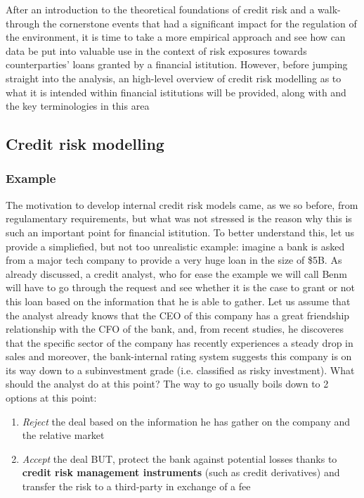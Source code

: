 \documentclass[a4paper,12pt]{article}
\begin{document}
    After an introduction to the theoretical foundations of credit risk and a walk-through the cornerstone events that had a significant impact for the regulation of the environment,
    it is time to take a more empirical approach and see how can data be put into valuable use in the context of risk exposures towards counterparties' loans granted by a financial istitution.
    However, before jumping straight into the analysis, an high-level overview of credit risk modelling as to what it is intended within financial istitutions will be provided, along with and the key terminologies in this area

    \subsection[]{Credit risk modelling}

    \subsubsection{Example}
    The motivation to develop internal credit risk models came, as we so before, from regulamentary requirements, but what was not stressed is the reason why this is such an important point
    for financial istitution. To better understand this, let us provide a simpliefied, but not too unrealistic example: imagine a bank is asked from a major tech company to provide a very huge
    loan in the size of \$5B. As already discussed, a credit analyst, who for ease the example we will call Benm will have to go through the request and see whether it is the case to grant or not this loan 
    based on the information that he is able to gather. 
    Let us assume that the analyst already knows that the CEO of this company has a great friendship relationship with the CFO of the bank, and, from recent studies, he discoveres that the specific sector 
    of the company has recently experiences a steady drop in sales and moreover, the bank-internal rating system suggests this company is on its way down to a subinvestment grade (i.e. classified as risky investment). 
    What should the analyst do at this point? The way to go usually boils down to 2 options at this point:

        \begin{enumerate}
            \item \textit{Reject} the deal based on the information he has gather on the company and the relative market
            \item \textit{Accept} the deal BUT, protect the bank against potential losses thanks to \textbf{credit risk management instruments} (such as credit derivatives) and transfer the risk to a third-party in exchange of a fee
        \end{enumerate}
\end{document}
